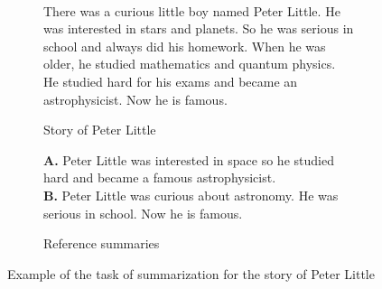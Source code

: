 \begin{figure}[H]\
\begin{subfigure}{\textwidth}
\begin{displayquote}
There was a curious little boy named Peter Little. He was interested in stars and planets. So he was serious in school and always did his homework. When he was older, he studied mathematics and quantum physics. He studied hard for his exams and became an astrophysicist. Now he is famous.
\end{displayquote}
\caption{Story of Peter Little}
\vspace{\baselineskip}
\end{subfigure}
\begin{subfigure}{\textwidth}
\begin{displayquote}
\textbf{A.} Peter Little was interested in space so he studied hard and became a famous astrophysicist.\\
\textbf{B.} Peter Little was curious about astronomy. He was serious in school. Now he is famous.\\
\caption{Reference summaries}
\end{displayquote}
\end{subfigure}
\caption{Example of the task of summarization for the story of Peter Little}
\label{fig:peter_little}
\end{figure}